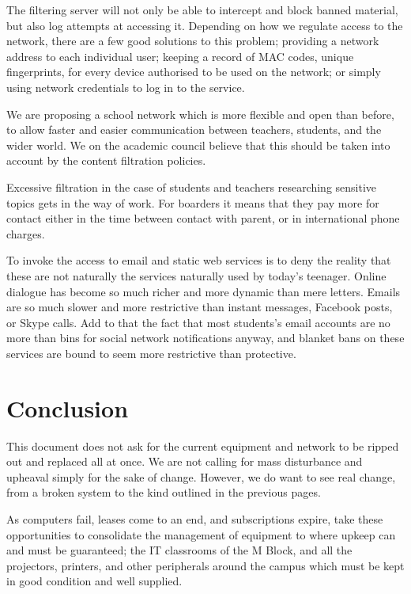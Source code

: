 \documentclass[a4paper,leqno,titlepage]{article}
\begin{document}

The filtering server will not only be able to intercept and block banned
material, but also log attempts at accessing it. Depending on how we regulate
access to the network, there are a few good solutions to this problem;
providing a network address to each individual user; keeping a record of
MAC codes, unique fingerprints, for every device authorised to be used on the
network; or simply using network credentials to log in to the service.


We are proposing a school network which is more flexible and open than before,
to allow faster and easier communication between teachers, students, and the
wider world. We on the academic council believe that this should be taken into
account by the content filtration policies.


Excessive filtration in the case of students and teachers researching sensitive
topics gets in the way of work. For boarders it means that they pay more for
contact either in the time between contact with parent, or in international
phone charges.


To invoke the access to email and static web services is to deny the reality
that these are not naturally the services naturally used by today's teenager.
Online dialogue has become so much richer and more dynamic than mere letters.
Emails are so much slower and more restrictive than instant messages, Facebook
posts, or Skype calls. Add to that the fact that most students's email accounts
are no more than bins for social network notifications anyway, and blanket
bans on these services are bound to seem more restrictive than protective.






\break








\section{Conclusion}

This document does not ask for the current equipment and network to be ripped
out and replaced all at once. We are not calling for mass disturbance and
upheaval simply for the sake of change.
However, we do want to see real change, from a
broken system to the kind outlined in the previous pages.


As computers fail, leases come to an end, and subscriptions expire,
take these opportunities to consolidate the management of equipment to where
upkeep can and must be guaranteed; the IT classrooms of the M Block,
and all the projectors, printers, and other peripherals
around the campus which must be kept in good condition and well supplied.
\end{document}
